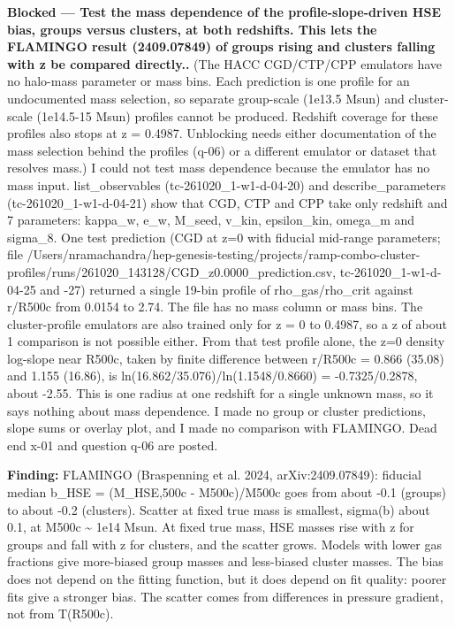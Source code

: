 \documentclass[11pt,a4paper]{article}
\begin{document}
\textbf{Blocked --- Test the mass dependence of the profile-slope-driven HSE bias, groups versus clusters, at both redshifts. This lets the FLAMINGO result (2409.07849) of groups rising and clusters falling with z be compared directly..} (The HACC CGD/CTP/CPP emulators have no halo-mass parameter or mass bins. Each prediction is one profile for an undocumented mass selection, so separate group-scale (1e13.5 Msun) and cluster-scale (1e14.5-15 Msun) profiles cannot be produced. Redshift coverage for these profiles also stops at z = 0.4987. Unblocking needs either documentation of the mass selection behind the profiles (q-06) or a different emulator or dataset that resolves mass.) I could not test mass dependence because the emulator has no mass input. list\_observables (tc-261020\_1-w1-d-04-20) and describe\_parameters (tc-261020\_1-w1-d-04-21) show that CGD, CTP and CPP take only redshift and 7 parameters: kappa\_w, e\_w, M\_seed, v\_kin, epsilon\_kin, omega\_m and sigma\_8. One test prediction (CGD at z=0 with fiducial mid-range parameters; file /Users/nramachandra/hep-genesis-testing/projects/ramp-combo-cluster-profiles/runs/261020\_143128/CGD\_z0.0000\_prediction.csv, tc-261020\_1-w1-d-04-25 and -27) returned a single 19-bin profile of rho\_gas/rho\_crit against r/R500c from 0.0154 to 2.74. The file has no mass column or mass bins. The cluster-profile emulators are also trained only for z = 0 to 0.4987, so a z of about 1 comparison is not possible either. From that test profile alone, the z=0 density log-slope near R500c, taken by finite difference between r/R500c = 0.866 (35.08) and 1.155 (16.86), is ln(16.862/35.076)/ln(1.1548/0.8660) = -0.7325/0.2878, about -2.55. This is one radius at one redshift for a single unknown mass, so it says nothing about mass dependence. I made no group or cluster predictions, slope sums or overlay plot, and I made no comparison with FLAMINGO. Dead end x-01 and question q-06 are posted.

\textbf{Finding:} FLAMINGO (Braspenning et al. 2024, arXiv:2409.07849): fiducial median b\_HSE = (M\_HSE,500c - M500c)/M500c goes from about -0.1 (groups) to about -0.2 (clusters). Scatter at fixed true mass is smallest, sigma(b) about 0.1, at M500c \textasciitilde{} 1e14 Msun. At fixed true mass, HSE masses rise with z for groups and fall with z for clusters, and the scatter grows. Models with lower gas fractions give more-biased group masses and less-biased cluster masses. The bias does not depend on the fitting function, but it does depend on fit quality: poorer fits give a stronger bias. The scatter comes from differences in pressure gradient, not from T(R500c).
\end{document}
